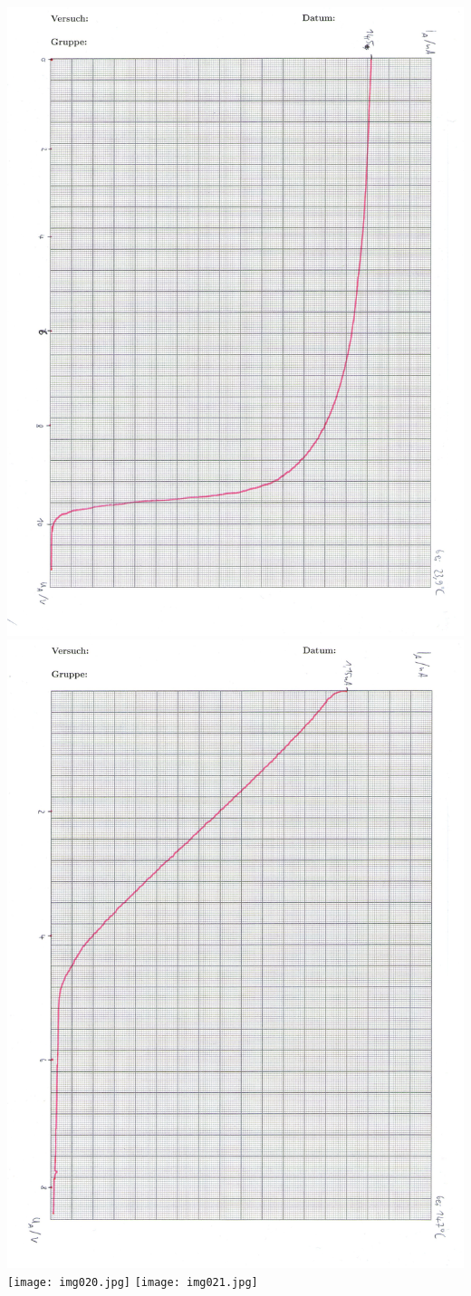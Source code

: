 \includegraphics[scale=0.75]{img018.jpg}
\includegraphics[scale=0.75]{img019.jpg}
\texttt{[image: img020.jpg]}
\texttt{[image: img021.jpg]}
